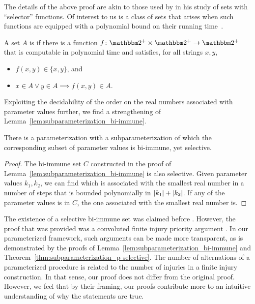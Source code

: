 The details of the above proof are akin to those used by \textcite{jockusch1968semirecursive} in his study of sets with \enquote{selector} functions.
Of interest to us is a class of sets that arises when such functions are equipped with a polynomial bound on their running time~\parencite{selman1979p-selective}.
\begin{definition}
\label{def:p-selective}%
  A set $A$ is  if there is a function $f\colon \binary^+ \times \binary^+ \to \binary^+$ that is computable in polynomial time and satisfies, for all strings $x, y$,
  \begin{itemize}
  \item $f(x, y) \in \{x, y\}$, and
  \item $x \in A \lor y \in A \implies f(x, y) \in A$.
  \end{itemize}
\end{definition}

Exploiting the decidability of the order on the real numbers associated with parameter values further, we find a strengthening of Lemma~\ref{lem:subparameterization_bi-immune}.
\begin{theorem}
\label{thm:subparameterization_p-selective}%
  There is a parameterization with a subparameterization of which the corresponding subset of parameter values is bi-immune, yet \pdash{}selective.
\end{theorem}
\begin{proof}
  The bi-immune set $C$ constructed in the proof of Lemma~\ref{lem:subparameterization_bi-immune} is also \pdash{}selective.
  Given parameter values $k_1, k_2$, we can find which is associated with the smallest real number in a number of steps that is bounded polynomially in ${\lvert k_1\rvert} + {\lvert k_2\rvert}$.
  If any of the parameter values is in $C$, the one associated with the smallest real number is.
\end{proof}

The existence of a \pdash{}selective bi-immune set was claimed before \parencite{goldsmith1993note}.
However, the proof that was provided was a convoluted finite injury priority argument \parencite[see also][Section~2.11]{downey2010algorithmic}.
In our parameterized framework, such arguments can be made more transparent, as is demonstrated by the proofs of Lemma~\ref{lem:subparameterization_bi-immune} and Theorem~\ref{thm:subparameterization_p-selective}.
The number of alternations of a parameterized procedure is related to the number of injuries in a finite injury construction.
In that sense, our proof does not differ from the original proof.
However, we feel that by their framing, our proofs contribute more to an intuitive understanding of why the statements are true.
